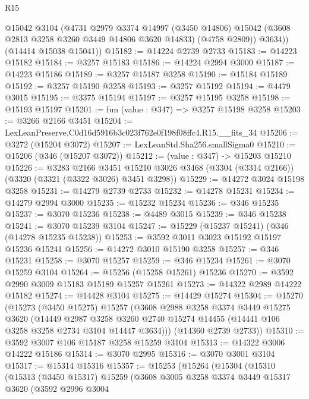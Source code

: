 \begin{lexlean}{R15}
\begin{coremodule}
          @15042
          @3104
          (@4731
            @2979
            @3374
            @14997
            (@3450 @14806)
            @15042
            (@3608 @2813 @3258 @3260 @3449 @14806 @3620 @14833)
            (@4758 @2809))
          @3634))
      (@14414 @15038 @15041))
@15182 := @14224 @2739 @2733
@15183 := @14223 @15182
@15184 := @3257 @15183
@15186 := @14224 @2994 @3000
@15187 := @14223 @15186
@15189 := @3257 @15187 @3258
@15190 := @15184 @15189
@15192 := @3257 @15190 @3258
@15193 := @3257 @15192
@15194 := @4479 @3015
@15195 := @3375 @15194
@15197 := @3257 @15195 @3258
@15198 := @15193 @15197
@15201 := fun (value : @347) => @3257 @15198 @3258
@15203 := @3266 @2166 @3451
@15204 := LexLeanPreserve.C0d16d5916b3c023f762e0f198f08ffc4.R15.__fits_34
@15206 := @3272 (@15204 @3072)
@15207 := LexLeanStd.Sha256.smallSigma0
@15210 := @15206 (@346 (@15207 @3072))
@15212 := (value : @347) -> @15203 @15210
@15226 := @3283
    @2166
    @3451
    @15210
    @3026
    @3468
    (@3304 (@3314 @2166))
    (@3320 (@3321 (@3322 @3026) @3451 @3298))
@15229 := @14272 @3024 @15198 @3258
@15231 := @14279 @2739 @2733
@15232 := @14278 @15231
@15234 := @14279 @2994 @3000
@15235 := @15232 @15234
@15236 := @346 @15235
@15237 := @3070 @15236
@15238 := @4489 @3015
@15239 := @346 @15238
@15241 := @3070 @15239 @3104
@15247 := @15229 (@15237 @15241) (@346 (@14278 @15235 @15238))
@15253 := @3592 @3011 @3023 @15192 @15197 @15236 @15241
@15256 := @14272 @3010 @15190 @3258
@15257 := @346 @15231
@15258 := @3070 @15257
@15259 := @346 @15234
@15261 := @3070 @15259 @3104
@15264 := @15256 (@15258 @15261) @15236
@15270 := @3592 @2990 @3009 @15183 @15189 @15257 @15261
@15273 := @14322 @2989 @14222 @15182
@15274 := @14428 @3104
@15275 := @14429 @15274
@15304 := @15270
    (@15273
      (@3450 @15275)
      @15257
      (@3608
        @2988
        @3258
        @3374
        @3449
        @15275
        @3620
        (@14449
          @2987
          @3258
          @3260
          @2740
          @15274
          @14455
          (@14441 @106 @3258 @3258 @2734 @3104 @14447 @3634)))
      (@14360 @2739 @2733))
@15310 := @3592 @3007 @106 @15187 @3258 @15259 @3104
@15313 := @14322 @3006 @14222 @15186
@15314 := @3070 @2995
@15316 := @3070 @3001 @3104
@15317 := @15314 @15316
@15357 := @15253
    (@15264
      (@15304
        (@15310
          (@15313
            (@3450 @15317)
            @15259
            (@3608
              @3005
              @3258
              @3374
              @3449
              @15317
              @3620
              (@3592
                @2996
                @3004

\end{coremodule}
\end{lexlean}
